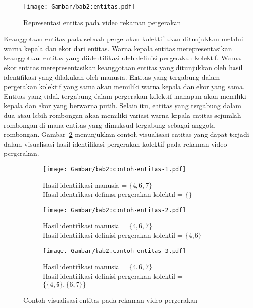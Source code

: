\begin{figure}[t]
    \centering
    \texttt{[image: Gambar/bab2:entitas.pdf]}
    \caption{Representasi entitas pada video rekaman pergerakan}
    \label{bab2:entitas}
\end{figure}

Keanggotaan entitas pada sebuah pergerakan kolektif akan ditunjukkan melalui warna kepala dan ekor dari entitas. Warna kepala entitas merepresentasikan keanggotaan entitas yang diidentifikasi oleh definisi pergerakan kolektif. Warna ekor entitas merepresentasikan keanggotaan entitas yang ditunjukkan oleh hasil identifikasi yang dilakukan oleh manusia. Entitas yang tergabung dalam pergerakan kolektif yang sama akan memiliki warna kepala dan ekor yang sama. Entitas yang tidak tergabung dalam pergerakan kolektif manapun akan memiliki kepala dan ekor yang berwarna putih. Selain itu, entitas yang tergabung dalam dua atau lebih rombongan akan memiliki variasi warna kepala entitas sejumlah rombongan di mana entitas yang dimaksud tergabung sebagai anggota rombongan. Gambar~\ref{bab2:contoh-visualisasi-entitas} menunjukkan contoh visualisasi entitas yang dapat terjadi dalam visualisasi hasil identifikasi pergerakan kolektif pada rekaman video pergerakan.

\begin{figure}[h]
    \centering
    \begin{subfigure}[h]{0.3\textwidth}
        \centering
        \texttt{[image: Gambar/bab2:contoh-entitas-1.pdf]}
        \caption{Hasil identifikasi manusia = $\{4, 6, 7\}$ \\ Hasil identifikasi definisi pergerakan kolektif = $\{\}$}
    \end{subfigure} \hspace{0.25cm}
    \begin{subfigure}[h]{0.3\textwidth}
        \centering
        \texttt{[image: Gambar/bab2:contoh-entitas-2.pdf]}
        \caption{Hasil identifikasi manusia = $\{4, 6, 7\}$ \\ Hasil identifikasi definisi pergerakan kolektif = $\{4, 6\}$}
    \end{subfigure} \hspace{0.25cm}
    \begin{subfigure}[h]{0.3\textwidth}
        \centering
        \texttt{[image: Gambar/bab2:contoh-entitas-3.pdf]}
        \caption{Hasil identifikasi manusia = $\{4, 6, 7\}$ \\ Hasil identifikasi definisi pergerakan kolektif = $\{\{4, 6\}, \{6, 7\}\}$}
    \end{subfigure}
    \caption{Contoh visualisasi entitas pada rekaman video pergerakan}
    \label{bab2:contoh-visualisasi-entitas}
\end{figure}
